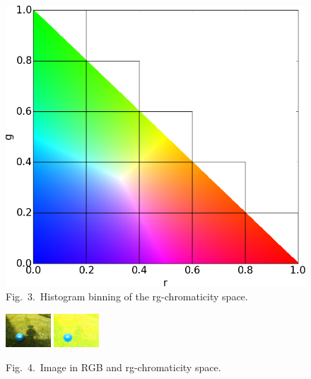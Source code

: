 \documentclass{article}
\begin{document}
\begin{multicols}{3}
\begin{minipage}[c]{0.57\linewidth}
\end{minipage}
\begin{minipage}[c]{0.4\linewidth}
\begin{figure}[H]
\includegraphics[width=1\linewidth]{Images/General/RgChromacityQuads.png}		
{\myCaption Fig.~3.~Histogram binning of the rg-chromaticity space.}
\end{figure}
\end{minipage}



\begin{figure}[H]
\begin{center}
\includegraphics[width=0.15\textwidth]{Images/General/BlueBall_4_10.jpg}
\hspace{10 pt}
\includegraphics[width=0.15\textwidth]{Images/General/BlueBall_4_10_rgComplete_bright.jpg}
\end{center}
\begin{center}
{\myCaption Fig.~4.~Image in RGB and rg-chromaticity space.}
\end{center}
\end{figure}




\end{multicols}
\end{document}
